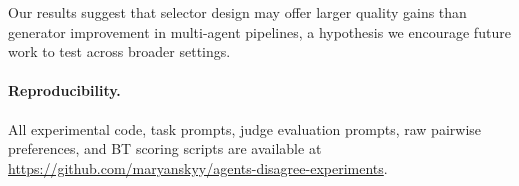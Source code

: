 \documentclass[10pt,twocolumn]{article}
\theoremstyle{remark}
\begin{document}
Our results suggest that selector design may offer larger quality gains than generator improvement in multi-agent pipelines, a hypothesis we encourage future work to test across broader settings.

\paragraph{Reproducibility.} All experimental code, task prompts, judge evaluation prompts, raw pairwise preferences, and BT scoring scripts are available at \url{https://github.com/maryanskyy/agents-disagree-experiments}.



\end{document}
